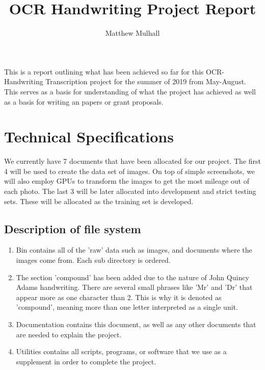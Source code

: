 \documentclass[12pt]{article} %
\title{OCR Handwriting Project Report}
\author{Matthew Mulhall}
\affil{matthew.l.mulhall@uconn.edu}
\begin{document}
\maketitle
This is a report outlining what has been achieved so far for this OCR-Handwriting Transcription project for the summer of 2019 from May-August. This serves as a basis for understanding of what the project has achieved as well as a basis for writing an papers or grant proposals.

\section{Technical Specifications}
\noindent\makebox[\linewidth]{\rule{15cm}{0.4pt}}
We currently have 7 documents that have been allocated for our project. The first 4 will be used to create the data set of images. On top of simple screenshots, we will also employ GPUs to transform the images to get the most mileage out of each photo. The last 3 will be later allocated into development and strict testing sets. These will be allocated as the training set is developed.

\subsection{Description of file system}
\begin{enumerate}[label = (\roman*)]
\item Bin contains all of the 'raw' data such as images, and documents where the images come from. Each sub directory is ordered.
\item The section 'compound' has been added due to the nature of John Quincy Adams handwriting. There are several small phrases like 'Mr' and 'Dr' that appear more as one character than 2. This is why it is denoted as 'compound', meaning more than one letter interpreted as a single unit.
\item Documentation contains this document, as well as any other documents that are needed to explain the project.
\item Utilities contains all scripts, programs, or software that we use as a supplement in order to complete the project.
\end{enumerate}
\end{document}
